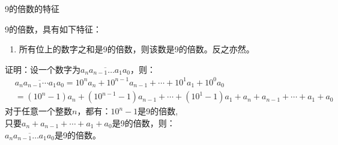 \documentclass[aspectratio=169]{ctexbeamer} %
\date{\today}
\begin{document}
\begin{frame}[t]{9的倍数的特征}
\begin{spacing}{1.2}
\normalsize
9的倍数，具有如下特征：
\begin{enumerate}[label={\arabic*.}]
\item 所有位上的数字之和是9的倍数，则该数是9的倍数。反之亦然。
\end{enumerate}
证明：设一个数字为$\overline{a_{n}a_{n-1} \dots a_{1}a_{0}}$，则：
\begin{align*}
&\overline{a_{n}a_{n-1} \cdots a_{1}a_{0}} = 10^{n}a_{n} + 10^{n-1}a_{n-1} +\cdots + 10^{1}a_{1} + 10^0a_{0} \\
&=(10^{n}-1)a_{n} + (10^{n-1}-1)a_{n-1}+ \cdots + (10^{1}-1)a_{1} + a_{n} +  a_{n-1} +\cdots + a_{1} + a_{0} 
\end{align*}
对于任意一个整数$n$，都有：$10^{n}-1$是9的倍数, \\
只要$a_{n} +  a_{n-1} +\cdots + a_{1} + a_{0}$是9的倍数，则：\\
$\overline{a_{n}a_{n-1} \dots a_{1}a_{0}}$是9的倍数。
\end{spacing}
\end{frame}
\end{document}
